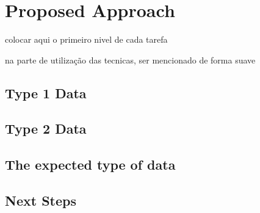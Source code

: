 \chapter{Proposed Approach}
\label{cha:available_data}


colocar aqui o primeiro nivel de cada tarefa

na parte de utilização das tecnicas, ser mencionado de forma suave

\section{Type 1 Data} %
\label{sec:type_1_data}

\section{Type 2 Data} %
\label{sec:type_2_data}

\section{The expected type of data}
\label{sec:expected_data}

\section{Next Steps} %
\label{sec:available_data_next_steps}
